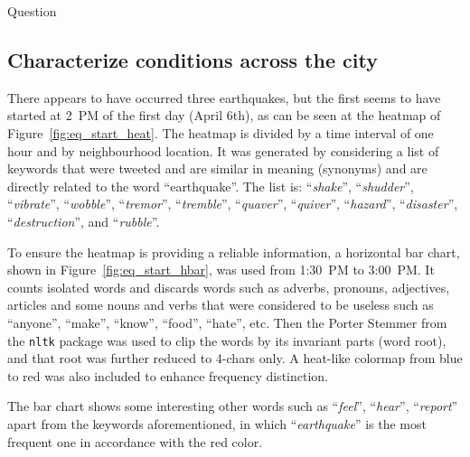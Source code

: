 \begin{section}{Question}
\subsection{Characterize conditions across the city}
There appears to have occurred three earthquakes, but the first seems to
have started at 2~PM of the first day (April 6th), as
can be seen at the heatmap of Figure~\ref{fig:eq_start_heat}. The heatmap is
divided by a time interval of one hour and by neighbourhood location. It was
generated by considering a list of keywords that were tweeted and are similar in 
meaning (synonyms) and are directly related to the word ``earthquake''. The list 
is: ``\emph{shake}'', ``\emph{shudder}'', ``\emph{vibrate}'', ``\emph{wobble}'',
``\emph{tremor}'', ``\emph{tremble}'', ``\emph{quaver}'', ``\emph{quiver}'',
``\emph{hazard}'', ``\emph{disaster}'', ``\emph{destruction}'', and
``\emph{rubble}''.

To ensure the heatmap is providing a reliable information, a horizontal bar
chart, shown in Figure~\ref{fig:eq_start_hbar}, was used from 1:30~PM to 
3:00~PM. It counts isolated 
words and discards words such as adverbs, pronouns, adjectives, articles and 
some nouns and verbs that were considered to be useless such as ``anyone'',
``make'', ``know'', ``food'', ``hate'', etc. Then the Porter Stemmer from the
\texttt{nltk} package was used to clip the words by its invariant parts (word 
root), and that root was further reduced to 4-chars only. A heat-like colormap
from blue to red was also included to enhance frequency distinction. 

The bar chart shows some interesting other words such as ``\emph{feel}'',
``\emph{hear}'', ``\emph{report}'' apart from the keywords aforementioned, in
which ``\emph{earthquake}'' is the most frequent one in accordance with the red
color.


\end{section}
